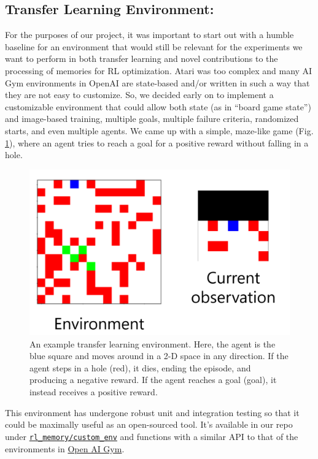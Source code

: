 \documentclass[11pt]{article}
\begin{document}
\subsection*{Transfer Learning Environment:}

For the purposes of our project, it was important to start out with a humble baseline for an environment that would still be relevant for the experiments we want to perform in both transfer learning and novel contributions to the processing of memories for RL optimization. Atari was too complex and many AI Gym environments in OpenAI are state-based and/or written in such a way that they are not easy to customize. So, we decided early on to implement a customizable environment that could allow both state (as in ``board game state'') and image-based training, multiple goals, multiple failure criteria, randomized starts, and even multiple agents. We came up with a simple, maze-like game (Fig. \ref{fig:custom-env}), where an agent tries to reach a goal for a positive reward without falling in a hole. 

\begin{figure}[H]
\centering
\includegraphics[width=0.99\linewidth]{figures/custom-env-background.png}
\caption{An example transfer learning environment. Here, the agent is the blue square and moves around in a 2-D space in any direction. If the agent steps in a hole (red), it dies, ending the episode, and producing a negative reward. If the agent reaches a goal (goal), it instead receives a positive reward.}
\label{fig:custom-env}
\end{figure}

This environment has undergone robust unit and integration testing so that it could be maximally useful as an open-sourced tool. It's available in our repo under \href{https://github.com/eskalnes/RL_memory/tree/main/rl_memory/custom_env}{\texttt{rl\_memory/custom\_env}} and functions with a similar API to that of the environments in \href{https://gym.openai.com/docs}{Open AI Gym}. 
\end{document}
